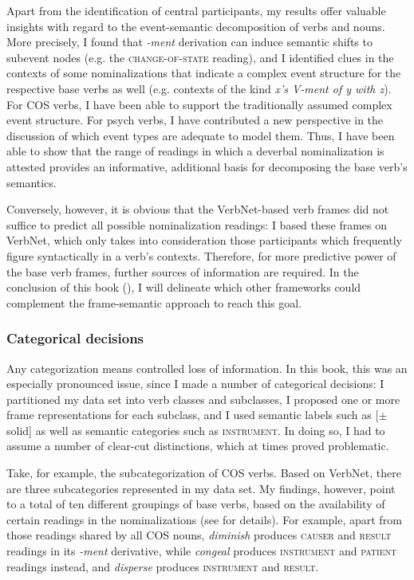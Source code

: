 Apart from the identification of central participants, my results offer valuable insights with regard to the event-semantic decomposition of verbs and nouns. 
More precisely, I found that \textit{-ment} derivation can induce semantic shifts to sub\-event nodes (e.g. the \textsc{change-of-state} reading), and I identified clues in the contexts of some nominalizations that indicate a complex event structure for the respective base verbs as well (e.g. contexts of the kind \textit{x's V-ment of y with z}). 
For COS verbs, I have been able to support the traditionally assumed complex event structure. 
For psych verbs, I have contributed a new perspective in the discussion of which event types are adequate to model them. 
Thus, I have been able to show that the range of readings in which a deverbal nominalization is attested provides an informative, additional basis for decomposing the base verb's semantics. 

Conversely, however, it is obvious that the VerbNet-based verb frames did not suffice to predict all possible nominalization readings: I based these frames on VerbNet, which only takes into consideration those participants which frequently figure syntactically in a verb's contexts.  
Therefore, for more predictive power of the base verb frames, further sources of information are required. In the conclusion of this book (), I will delineate which other frameworks could complement the frame-semantic approach to reach this goal.

\subsubsection{Categorical decisions}

Any categorization means controlled loss of information. In this book, this was an especially pronounced issue, since I made a number of categorical decisions: 
I partitioned my data set into verb classes and subclasses, I proposed one or more frame representations for each subclass, and I used semantic labels such as [$\pm$solid] as well as semantic categories such as \textsc{instrument}. In doing so, I had to assume a number of clear-cut distinctions, which at times proved problematic. 

Take, for example, the subcategorization of COS verbs. Based on VerbNet, there are three subcategories represented in my data set. 
My findings, however, point to a total of ten different groupings of base verbs, based on the availability of certain readings in the nominalizations (see  for details). 
For example, apart from those readings shared by all COS nouns, \textit{diminish} produces \textsc{causer} and \textsc{result} readings in its \textit{-ment} derivative, while \textit{congeal} produces \textsc{instrument} and \textsc{patient} readings instead, and \textit{disperse} produces \textsc{instrument} and \textsc{result}.

